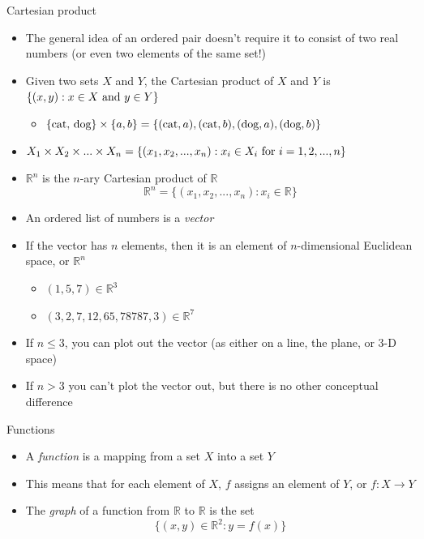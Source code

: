 \documentclass[10pt]{seminar}
\begin{document}
\begin{slide}
\begin{itemize}
\end{itemize}


\newslide
Cartesian product

\begin{itemize}
\item The general idea of an ordered pair doesn't require it to consist of two real numbers (or even two elements  of the same set!)

\item Given two sets $X$ and $Y$, the Cartesian product of $X$ and $Y$ is $\{(x, y): x\in X \hbox{ and }y\in Y\}$

\begin{itemize}
\item $\{\hbox{cat, dog}\}\times \{a, b\}= \{(\hbox{cat}, a), (\hbox{cat}, b), (\hbox{dog}, a), (\hbox{dog}, b)\}$
\end{itemize}

\item $X_1\times X_2\times ... \times X_n=\{(x_1, x_2, ..., x_n):x_i\in X_i \hbox{ for }i=1, 2, ..., n\}$

\item $\mathbb{R}^n$ is the $n$-ary Cartesian product of $\mathbb{R}$
$$\mathbb{R}^n=\{(x_1, x_2, ..., x_n): x_i\in \mathbb{R} \}$$


\newslide

\item An ordered list of numbers is a \textit{vector}
\item If the vector has $n$ elements, then it is an element of $n$-dimensional Euclidean space, or $\mathbb{R}^n$

\begin{itemize}
\item $(1, 5, 7)\in \mathbb{R}^3$
\item $(3, 2, 7, 12, 65, 78787, 3)\in \mathbb{R}^7$

\end{itemize}
\item If $n\leq 3$, you can plot out the vector (as either on a line, the plane, or 3-D space)
\item If $n>3$ you can't plot the vector out, but there is no other conceptual difference


\end{itemize}


\newslide 

Functions

\begin{itemize}
\item A \textit{function} is a mapping from a set $X$ into a set $Y$ 
\item This means that for each element of $X$, $f$ assigns an element of $Y$, or $f: X\rightarrow Y$
\item The \textit{graph} of a function from $\mathbb{R} $ to $\mathbb{R}$ is the set $$\{(x, y)\in \mathbb{R}^2: y=f(x)\}$$


\end{itemize}
\end{slide}
\end{document}
